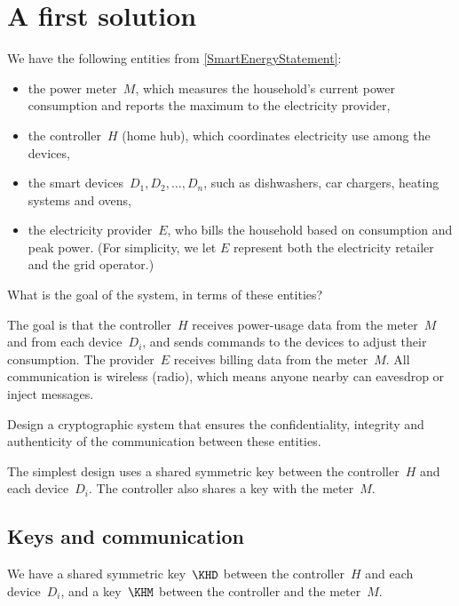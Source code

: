 \section{A first solution}\label{EnergyFirstSolution}

We have the following entities from \cref{SmartEnergyStatement}:
\begin{itemize}
  \item the power meter~\(M\), which measures the household's current power
    consumption and reports the maximum to the electricity provider,
  \item the controller~\(H\) (home hub), which coordinates electricity use
    among the devices,
  \item the smart devices~\(D_1, D_2, \ldots, D_n\), such as dishwashers,
    car chargers, heating systems and ovens,
  \item the electricity provider~\(E\), who bills the household based on
    consumption and peak power.
    (For simplicity, we let \(E\) represent both the electricity retailer
    and the grid operator.)
\end{itemize}

\begin{exercise}
  What is the goal of the system, in terms of these entities?
\end{exercise}

The goal is that the controller~\(H\) receives power-usage data from the
meter~\(M\) and from each device~\(D_i\), and sends commands to the
devices to adjust their consumption.
The provider~\(E\) receives billing data from the meter~\(M\).
All communication is wireless (radio), which means anyone nearby can
eavesdrop or inject messages.

\begin{exercise}
  Design a cryptographic system that ensures the confidentiality, integrity
  and authenticity of the communication between these entities.
\end{exercise}

The simplest design uses a shared symmetric key between the controller~\(H\)
and each device~\(D_i\).
The controller also shares a key with the meter~\(M\).

\subsection{Keys and communication}

We have a shared symmetric key~\(\KHD\) between the controller~\(H\) and
each device~\(D_i\), and a key~\(\KHM\) between the controller and the
meter~\(M\).

